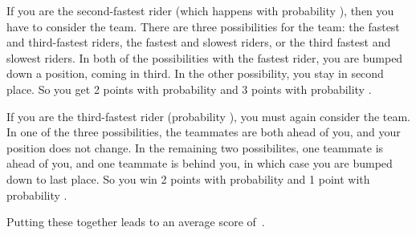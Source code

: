 \documentclass{article}
\begin{document}
If you are the second-fastest rider (which happens with probability ), then you have to consider the team.
There are three possibilities for the team: the fastest and third-fastest riders, the fastest and slowest riders, or the third fastest and slowest riders.
In both of the possibilities with the fastest rider, you are bumped down a position, coming in third.
In the other possibility, you stay in second place.
So you get 2 points with probability  and 3 points with probability .

If you are the third-fastest rider (probability ), you must again consider the team.
In one of the three possibilities, the teammates are both ahead of you, and your position does not change.
In the remaining two possibilites, one teammate is ahead of you, and one teammate is behind you, in which case you are bumped down to last place.
So you win 2 points with probability  and 1 point with probability .

Putting these together leads to an average score of
\,.
\end{document}
